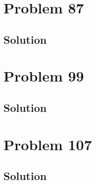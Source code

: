 \documentclass[12pt]{article}
\begin{document}
    \pagebreak
    \section{Problem 87}

        \subsection{Solution}

    \pagebreak
    \section{Problem 99}

        \subsection{Solution}

    \pagebreak
    \section{Problem 107}

        \subsection{Solution}

    \pagebreak

    \tableofcontents
\end{document}
